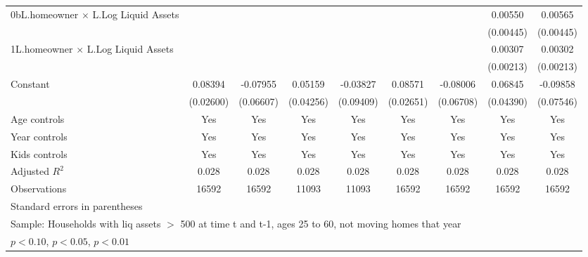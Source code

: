 {\begin{longtable}{l*{8}{c}}
\addlinespace
0bL.homeowner $\times$ L.Log Liquid Assets&                     &                     &                     &                     &                     &                     &     0.00550         &     0.00565         \\
                    &                     &                     &                     &                     &                     &                     &   (0.00445)         &   (0.00445)         \\
\addlinespace
1L.homeowner $\times$ L.Log Liquid Assets&                     &                     &                     &                     &                     &                     &     0.00307         &     0.00302         \\
                    &                     &                     &                     &                     &                     &                     &   (0.00213)         &   (0.00213)         \\
\addlinespace
Constant            &     0.08394\sym{***}&    -0.07955         &     0.05159         &    -0.03827         &     0.08571\sym{***}&    -0.08006         &     0.06845         &    -0.09858         \\
                    &   (0.02600)         &   (0.06607)         &   (0.04256)         &   (0.09409)         &   (0.02651)         &   (0.06708)         &   (0.04390)         &   (0.07546)         \\
\addlinespace
Age controls        &         Yes         &         Yes         &         Yes         &         Yes         &         Yes         &         Yes         &         Yes         &         Yes         \\
\addlinespace
Year controls       &         Yes         &         Yes         &         Yes         &         Yes         &         Yes         &         Yes         &         Yes         &         Yes         \\
\addlinespace
Kids controls       &         Yes         &         Yes         &         Yes         &         Yes         &         Yes         &         Yes         &         Yes         &         Yes         \\
\midrule
Adjusted \(R^{2}\)  &       0.028         &       0.028         &       0.028         &       0.028         &       0.028         &       0.028         &       0.028         &       0.028         \\
Observations        &       16592         &       16592         &       11093         &       11093         &       16592         &       16592         &       16592         &       16592         \\
\bottomrule
\multicolumn{9}{l}{\footnotesize Standard errors in parentheses}\\
\multicolumn{9}{l}{\footnotesize Sample: Households with liq assets $>$ 500 at time t and t-1, ages 25 to 60, not moving homes that year}\\
\multicolumn{9}{l}{\footnotesize \sym{*} \(p<0.10\), \sym{**} \(p<0.05\), \sym{***} \(p<0.01\)}\\
\end{longtable}
}
